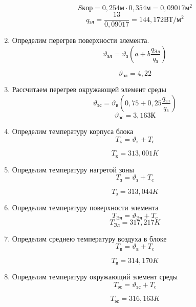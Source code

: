 \begin{enumerate}[label={\arabic*.}]
    $$S\mathrm{кор} = 0,254\mathrm{м} \cdot 0,354\mathrm{м} = 0,09017\mathrm{м^2}$$
    $$q\mathrm{_{эл}} = \frac{13}{0,09017} =144,172\mathrm{ВТ/м^2} $$
  \item Определим перегрев поверхности элемента.
    \begin{equation}
      \vartheta\mathrm{_{эл}} = \vartheta\mathrm{_{з}}(a + b \frac{q\mathrm{_{Эл}}}{q\mathrm{_{з}}})
    \end{equation}

    $$\vartheta\mathrm{_{эл}} = 4,22$$

  \item Рассчитаем перегрев окружающей элемент среды
    \begin{equation}
      \vartheta\mathrm{_{эс}} = \vartheta\mathrm{_в}(0,75 + 0,25\frac{q\mathrm{_{эл}}}{q\mathrm{_{з}}})
    \end{equation}
    $$\vartheta\mathrm{_{эс}} = 3,163К$$

 \item Определим температуру корпуса блока
    \begin{equation}
      T\mathrm{_к} = \vartheta\mathrm{_к} + T\mathrm{_с}
    \end{equation}
    
    $$T\mathrm{_к} = 313,001K$$
  \item Определим температуру нагретой зоны
    \begin{equation}
      T\mathrm{_з} = \vartheta\mathrm{_з} + T\mathrm{_c}
    \end{equation}
    
    $$T\mathrm{_з} = 313,044 K$$

  \item Определим температуру поверхности элемента
    \begin{equation}
      T\mathrm{_{Эл}} = \vartheta\mathrm{_{Эл}} + T\mathrm{_c}
    \end{equation}
    $$T\mathrm{_{Эл}} = 317,217 K$$

  \item Определим среднею температуру воздуха в блоке
    \begin{equation}
      T\mathrm{_в} = \vartheta\mathrm{_в} + T\mathrm{_c}
    \end{equation}

    $$T\mathrm{_в} =314,170 K$$
  \item Определим температуру окружающий элемент среды
    \begin{equation}
      T\mathrm{_{эс}} = \vartheta\mathrm{_{эс}} + T\mathrm{_c}
    \end{equation}
    
    $$T\mathrm{_{эс}} = 316,163 K$$

\end{enumerate}

